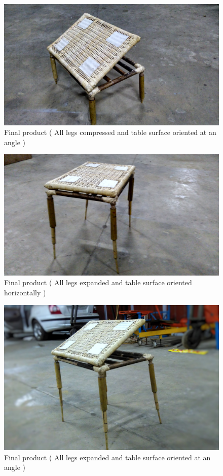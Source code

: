 \begin{figure}[h]
    \centering
    \includegraphics[width=\linewidth]{fi1}
    \caption{Final product ( All legs compressed and table surface oriented at an angle )}
    \label{fig:mesh1}
\end{figure}

\begin{figure}[h]
    \centering
    \includegraphics[width=\linewidth]{fi2}
    \caption{Final product ( All legs expanded and table surface oriented horizontally )}
    \label{fig:mesh2}
\end{figure}

\begin{figure}[h]
    \centering
    \includegraphics[width=\linewidth]{fi3}
    \caption{Final product ( All legs expanded and table surface oriented at an angle )}
    \label{fig:mesh3}
\end{figure}

